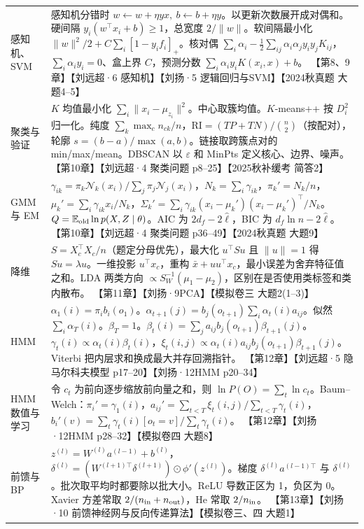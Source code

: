 \documentclass[UTF8,a4paper,zihao=-4,fontset=fandol]{ctexrep}
\begin{document}
\begin{longtable}{@{}p{.19\linewidth}p{.76\linewidth}@{}}
感知机、SVM & 感知机分错时 $w\gets w+\eta yx,\ b\gets b+\eta y$。以更新次数展开成对偶和。硬间隔 $y_i(w^\top x_i+b)\ge1$，总宽度 $2/\|w\|$。软间隔最小化 $\|w\|^2/2+C\sum_i[1-y_if_i]_+$。核对偶 $\sum_i\alpha_i-\tfrac12\sum_{ij}\alpha_i\alpha_jy_iy_jK_{ij}$，$\sum_i\alpha_iy_i=0$、盒上界 $C$，预测分数 $\sum_i\alpha_i y_iK(x_i,x)+b$。 【第8、9章】【刘远超·6 感知机】【刘扬·5 逻辑回归与SVM】【2024秋真题 大题4–5】\\[.4em]
聚类与验证 & $K$ 均值最小化 $\sum_i\|x_i-\mu_{z_i}\|^2$。中心取簇均值。$K$-means++ 按 $D_i^2$ 归一化。纯度 $\sum_k\max_c n_{ck}/n$，$\mathrm{RI}=(TP+TN)/\binom n2$（按配对），轮廓 $s=(b-a)/\max(a,b)$。链接取跨簇点对的 min/max/mean。DBSCAN 以 $\varepsilon$ 和 MinPts 定义核心、边界、噪声。 【第10章】【刘远超·4 聚类问题 p8–25】【2025秋补缓考 简答2】\\[.4em]
GMM 与 EM & $\gamma_{ik}=\pi_k\mathcal N_k(x_i)/\sum_j\pi_j\mathcal N_j(x_i)$，$N_k=\sum_i\gamma_{ik}$，$\pi_k'=N_k/n$，$\mu_k'=\sum_i\gamma_{ik}x_i/N_k$，$\Sigma_k'=\sum_i\gamma_{ik}(x_i-\mu_k')(x_i-\mu_k')^\top/N_k$。$Q=\mathbb E_{\rm old}\ln p(X,Z\mid \theta)$。AIC 为 $2d_f-2\hat\ell$，BIC 为 $d_f\ln n-2\hat\ell$。 【第10章】【刘远超·4 聚类问题 p36–49】【2024秋真题 大题9】\\[.4em]
降维 & $S=X_c^\top X_c/n$（题定分母优先），最大化 $u^\top Su$ 且 $\|u\|=1$ 得 $Su=\lambda u$。一维投影 $u^\top x_c$，重构 $\bar x+uu^\top x_c$，最小误差为舍弃特征值之和。LDA 两类方向 $\propto S_W^{-1}(\mu_1-\mu_2)$，区别在是否使用类标签和类内散布。 【第11章】【刘扬·9PCA】【模拟卷三 大题2(1–3)】\\[.4em]
HMM & $\alpha_1(i)=\pi_i b_i(o_1)$。$\alpha_{t+1}(j)=b_j(o_{t+1})\sum_i\alpha_t(i)a_{ij}$。似然 $\sum_i\alpha_T(i)$。$\beta_T=1$。$\beta_t(i)=\sum_j a_{ij}b_j(o_{t+1})\beta_{t+1}(j)$。$\gamma_t(i)\propto\alpha_t(i)\beta_t(i)$，$\xi_t(i,j)\propto\alpha_t(i)a_{ij}b_j(o_{t+1})\beta_{t+1}(j)$。Viterbi 把内层求和换成最大并存回溯指针。 【第12章】【刘远超·5 隐马尔科夫模型 p17–20】【刘扬·12HMM p20–34】\\[.4em]
HMM 数值与学习 & 令 $c_t$ 为前向逐步缩放前向量之和，则 $\ln P(O)=\sum_t\ln c_t$。Baum–Welch：$\pi_i'=\gamma_1(i)$，$a_{ij}'=\sum_{t<T}\xi_t(i,j)/\sum_{t<T}\gamma_t(i)$，$b_i'(v)=\sum_t\gamma_t(i)[o_t=v]/\sum_t\gamma_t(i)$。 【第12章】【刘扬·12HMM p28–32】【模拟卷四 大题8】\\[.4em]
前馈与 BP & $z^{(l)}=W^{(l)}a^{(l-1)}+b^{(l)}$，$\delta^{(l)}=(W^{(l+1)\top}\delta^{(l+1)})\odot\phi'(z^{(l)})$。梯度 $\delta^{(l)}a^{(l-1)\top}$ 与 $\delta^{(l)}$。批次取平均时都要除以批大小。ReLU 导数正区为 1，负区为 0。Xavier 方差常取 $2/(n_{\rm in}+n_{\rm out})$，He 常取 $2/n_{\rm in}$。 【第13章】【刘扬·10 前馈神经网与反向传递算法】【模拟卷三、四 大题1】\\[.4em]

\end{longtable}
\end{document}

